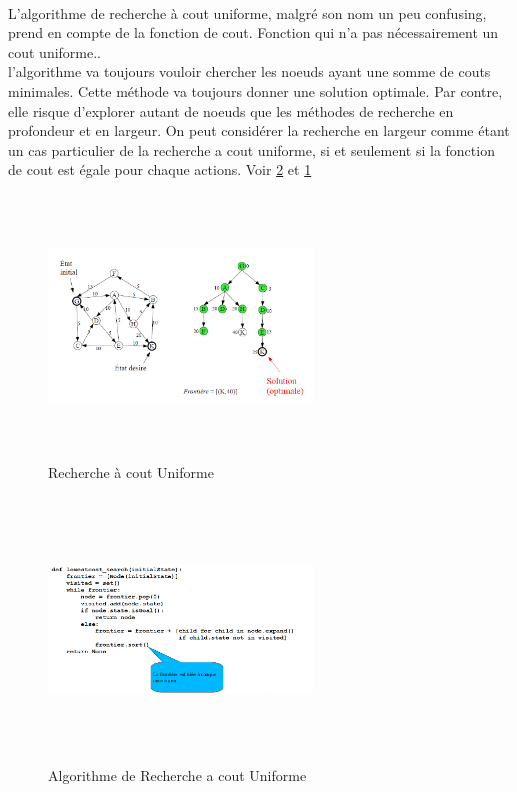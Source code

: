 \documentclass[oneside]{book}
\begin{document}
\paragraph{}
L'algorithme de recherche à cout uniforme, malgré son nom un peu confusing, prend en compte de la fonction de cout. Fonction qui n'a pas nécessairement un cout uniforme.. \\

l'algorithme va toujours vouloir chercher les noeuds ayant une somme de couts minimales. Cette méthode va toujours donner une solution optimale. Par contre, elle risque d'explorer autant de noeuds que les méthodes de recherche en profondeur et en largeur. On peut considérer la recherche en largeur comme étant un cas particulier de la recherche a cout uniforme, si et seulement si la fonction de cout est égale pour chaque actions. Voir \ref{fig:Algo_Recherche_Uniforme} et \ref{fig:Recherche_Uniforme}

\begin{figure}[!ht]
\centering
\includegraphics[width = 7cm, height = 7cm, keepaspectratio]{Recherche_Uniforme.png}
\caption{Recherche à cout Uniforme}
\label{fig:Recherche_Uniforme}
\end{figure}

\begin{figure}[!ht]
\centering
\includegraphics[width = 7cm, height = 7cm, keepaspectratio]{algo_uniforme.png}
\caption{Algorithme de Recherche a cout Uniforme}
\label{fig:Algo_Recherche_Uniforme}
\end{figure}
\end{document}
